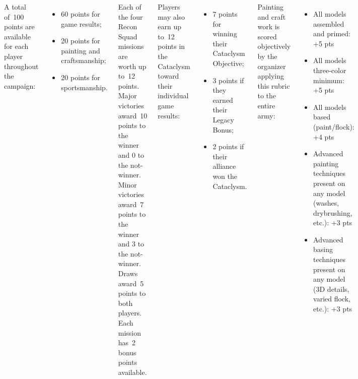 \begin{columns}
 A total of~100 points are
available for each player throughout the campaign:

\begin{itemize}\shortlist
\item 60 points for game results;
\item 20 points for painting and craftsmanship;
\item 20 points for sportsmanship.
\end{itemize}


Each of the four Recon Squad missions are worth up to~12 points.
Major victories award~10 points to the winner and 0 to the not-winner.
Minor victories award~7 points to the winner and 3 to the not-winner.
Draws award~5 points to both players.  Each mission has~2 bonus points
available.


Players may also earn up to~12 points in the Cataclysm toward their
individual game results:
\begin{itemize}\shortlist
\item 7 points for winning their Cataclysm Objective;
\item 3 points if they earned their Legacy Bonus;
\item 2 points if their alliance won the Cataclysm.
\end{itemize}



Painting and craft work is scored objectively by the organizer
applying this rubric to the entire army:

\begin{itemize}\shortlist
\item All models assembled and primed: \hfill +5 pts
\item All models three-color minimum: \hfill +5 pts
\item All models based (paint/flock): \hfill +4 pts
\item Advanced painting techniques present on any model (washes,
  drybrushing, etc.): \hfill +3 pts
\item Advanced basing techniques present on any model (3D details,
  varied flock, etc.): \hfill +3 pts
\end{itemize}


\end{columns}
